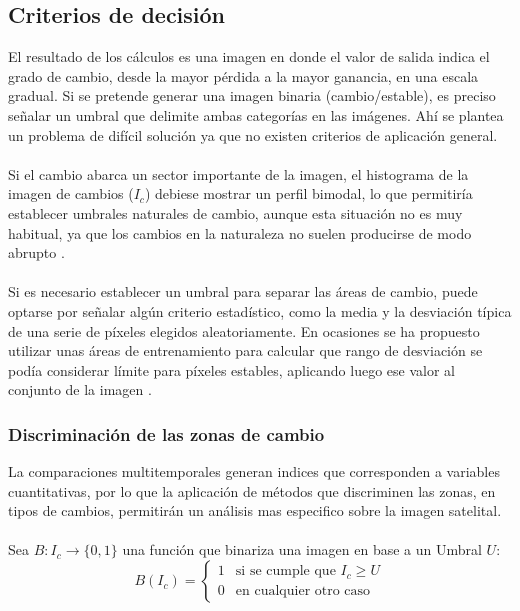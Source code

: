 \subsection{Criterios de decisi\'on}
El resultado de los c\'alculos es una imagen en donde el valor de salida indica el grado de cambio, desde la mayor p\'erdida a la mayor ganancia, en una escala gradual. Si se pretende generar una imagen binaria (cambio/estable), es preciso se\~{n}alar un umbral que delimite ambas categor\'ias en las im\'agenes. Ah\'i se plantea un problema de dif\'icil soluci\'on ya que no existen criterios de aplicaci\'on general.\\~\\
Si el cambio abarca un sector importante de la imagen, el histograma de la imagen de cambios ($ I_{c} $) debiese mostrar un perfil bimodal, lo que permitir\'ia establecer umbrales naturales de cambio, aunque esta situaci\'on no es muy habitual, ya que los cambios en la naturaleza no suelen producirse de modo abrupto \cite{martinez2013normalizacion}.\\~\\
Si es necesario establecer un umbral para separar las \'areas de cambio, puede optarse por se\~{n}alar alg\'un criterio estad\'istico, como la media y la desviaci\'on t\'ipica de una serie de p\'ixeles elegidos aleatoriamente. En ocasiones se ha propuesto utilizar unas \'areas de entrenamiento para calcular que rango de desviaci\'on se pod\'ia considerar l\'imite para p\'ixeles estables, aplicando luego ese valor al conjunto de la imagen \cite{tung1988determination}.

\subsubsection{Discriminaci\'on de las zonas de cambio}\label{sec:discriminacion}
La comparaciones multitemporales generan indices que corresponden a variables cuantitativas, por lo que la aplicaci\'on de m\'etodos que discriminen las zonas, en tipos de cambios, permitir\'an un an\'alisis mas especifico sobre la imagen satelital.\\~\\ 
Sea $ B:I_{c} \longrightarrow \{0,1\}$ 	una funci\'on que binariza una imagen en base a un Umbral $ U $:
\begin{equation}\label{ec:umbralizacion}
B(I_{c}) = \begin{cases}
1 & \text{si se cumple que } I_{c} \geq U \\
0 & \text{en cualquier otro caso}
\end{cases}
\end{equation}

